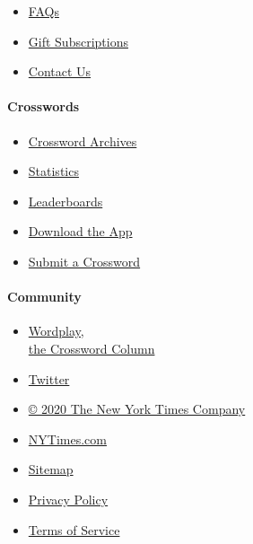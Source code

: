 \begin{itemize}
\tightlist
\item
  \href{https://help.nytimes3xbfgragh.onion/hc/en-us/articles/115014755667-New-York-Times-Crossword}{FAQs}
\item
  \href{https://nytimes3xbfgragh.onion/subscription/crosswords/gift}{Gift
  Subscriptions}
\item
  \href{mailto:NYTCrossword@NYTimes.com}{Contact Us}
\end{itemize}

\hypertarget{crosswords}{%
\paragraph{Crosswords}\label{crosswords}}

\begin{itemize}
\tightlist
\item
  \href{/crosswords/archive}{Crossword Archives}
\item
  \href{/puzzles/stats}{Statistics}
\item
  \href{/puzzles/leaderboards}{Leaderboards}
\item
  \href{/crosswords/apps}{Download the App}
\item
  \href{/puzzles/submissions/crossword}{Submit a Crossword}
\end{itemize}

\hypertarget{community}{%
\paragraph{Community}\label{community}}

\begin{itemize}
\tightlist
\item
  \href{https://nytimes3xbfgragh.onion/column/wordplay}{Wordplay,\\
  the Crossword Column}
\item
  \href{https://twitter.com/NYTimesWordplay}{Twitter}
\end{itemize}

\begin{itemize}
\tightlist
\item
  \href{https://www.nytco.com/}{© 2020 The New York Times Company}
\item
  \href{https://nytimes3xbfgragh.onion}{NYTimes.com}
\item
  \href{https://spiderbites.nytimes3xbfgragh.onion/}{Sitemap}
\item
  \href{https://nytimes3xbfgragh.onion/subscription/privacy-policy\#/privacy}{Privacy
  Policy}
\item
  \href{https://help.nytimes3xbfgragh.onion/hc/en-us/articles/115014893428-Terms-of-service}{Terms
  of Service}
\end{itemize}
